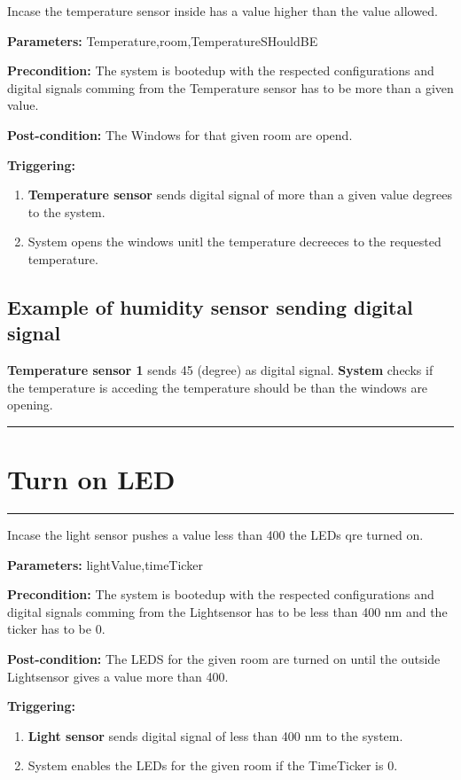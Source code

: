 Incase the temperature sensor inside has a value higher than the value allowed.
\begin{description}
\item \textbf{Parameters:} Temperature,room,TemperatureSHouldBE
\item \textbf{Precondition:} The system is bootedup with the respected
configurations and digital signals comming from the Temperature sensor has to be
more than a given value.
\item \textbf{Post-condition:} The Windows for that given room are opend.

\item \textbf{Triggering:}
\begin{enumerate}
\item \textbf{Temperature sensor} sends digital signal of more than a given
value degrees to the system.
\item System opens the windows unitl the temperature decreeces to the requested
temperature.
\end{enumerate}
\end{description}

\subsection{Example of humidity sensor sending digital signal}
\textbf{Temperature sensor 1} sends 45 (degree) as digital signal.
\textbf{System} checks if the temperature is acceding the temperature should be
than the windows are opening.
\hfill
\vspace{0.5cm}
\hrule




\section{Turn on LED}

\hrule
\hfill
\vspace{0.5cm}
\label{operation:Turn on LED}

Incase the light sensor pushes a value less than 400 the LEDs qre turned on.
\begin{description}
\item \textbf{Parameters:} lightValue,timeTicker
\item \textbf{Precondition:} The system is bootedup with the respected
configurations and digital signals comming from the Lightsensor has to be less
than 400 nm and the ticker has to be 0.
\item \textbf{Post-condition:} The LEDS for the given room are turned on until
the outside Lightsensor gives a value more than 400.

\item \textbf{Triggering:}
\begin{enumerate}
\item \textbf{Light sensor} sends digital signal of less than 400 nm to the
system.
\item System enables the LEDs for the given room if the TimeTicker is 0.
\end{enumerate}
\end{description}

